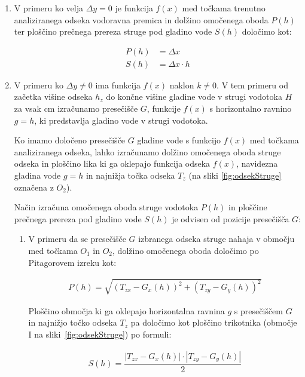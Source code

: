 \begin{enumerate}

\item V primeru ko velja $\Delta y = 0$ je funkcija $f(x)$ med točkama trenutno analiziranega odseka vodoravna premica in dolžino omočenega oboda $P(h)$ ter ploščino prečnega prereza struge pod gladino vode $S(h)$ določimo kot:

\begin{ceqn}
\begin{align}
P(h)&= \Delta x\\
S(h)&= \Delta x \cdot h
\end{align}
\end{ceqn}


\item V primeru ko $\Delta y \neq 0$ ima funkcija $f(x)$ naklon $k \neq 0$. V tem primeru od začetka višine odseka $h_z$ do končne višine gladine vode v strugi vodotoka $H$ za vsak cm izračunamo presečišče $G$, funkcije $f(x)$ s horizontalno ravnino $g = h$, ki predstavlja gladino vode v strugi vodotoka. 


Ko imamo določeno presečišče $G$ gladine vode s funkcijo $f(x)$ med točkama analiziranega odseka, lahko izračunamo dolžino omočenega oboda struge odseka in ploščino lika ki ga oklepajo funkcija odseka $f(x)$, navidezna gladina vode $g = h$ in najnižja točka odseka $T_z$ (na sliki \ref{fig:odsekStruge} označena z $O_2$). 



Način izračuna omočenega oboda struge vodotoka $P(h)$ in ploščine prečnega prereza pod gladino vode $S(h)$ je odvisen od pozicije presečišča $G$:


\begin{enumerate}
	\item V primeru da se presečišče $G$ izbranega odseka struge nahaja v območju med točkama $O_1$ in $O_2$, dolžino omočenega oboda določimo po Pitagorovem izreku kot:
	
	\begin{ceqn}
		\begin{align}
		P(h) = \sqrt{(T_{zx} - G_x(h))^{2} + (T_{zy} - G_y(h))^{2}}
		\end{align}
	\end{ceqn}
	
	
	Ploščino območja ki ga oklepajo horizontalna ravnina $g$ s presečiščem $G$ in najnižjo točko odseka $T_z$ pa določimo kot ploščino trikotnika (območje I na sliki~\ref{fig:odsekStruge}) po formuli:
	
	\begin{ceqn}
		\begin{align}
		S(h) = \dfrac{|T_{zx} - G_x(h)| \cdot |T_{zy} - G_y(h)|}{2}
		\end{align}
	\end{ceqn}
	

\end{enumerate}
\end{enumerate}

